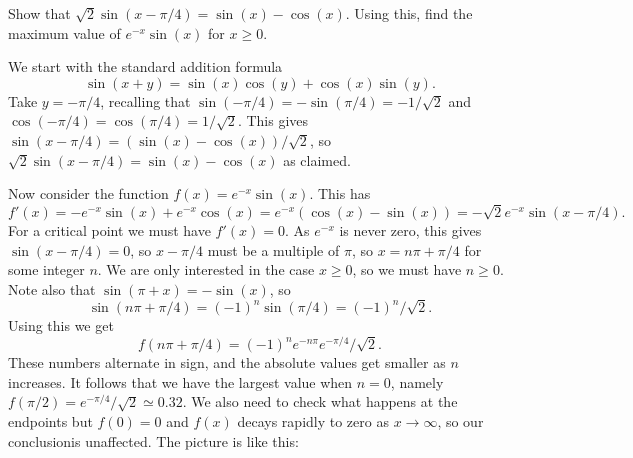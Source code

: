 \documentclass[a4paper]{amsart}
\renewenvironment{solution}{\SolutionInline}{\endSolutionInline}
\begin{document}
\begin{exercise}
 Show that $\sqrt{2}\sin(x-\pi/4)=\sin(x)-\cos(x)$.  Using this, find
 the maximum value of $e^{-x}\sin(x)$ for $x\geq 0$.
\end{exercise}
\begin{solution}
 We start with the standard addition formula
 \[ \sin(x+y) = \sin(x)\cos(y) + \cos(x)\sin(y). \]
 Take $y=-\pi/4$, recalling that
 $\sin(-\pi/4)=-\sin(\pi/4)=-1/\sqrt{2}$ and
 $\cos(-\pi/4)=\cos(\pi/4)=1/\sqrt{2}$.  This gives
 $\sin(x-\pi/4)=(\sin(x)-\cos(x))/\sqrt{2}$, so
 $\sqrt{2}\sin(x-\pi/4)=\sin(x)-\cos(x)$ as claimed.

 Now consider the function $f(x)=e^{-x}\sin(x)$.  This has
 \[ f'(x) = -e^{-x}\sin(x) + e^{-x}\cos(x) = 
     e^{-x}(\cos(x)-\sin(x)) = -\sqrt{2} e^{-x}\sin(x-\pi/4).
 \]
 For a critical point we must have $f'(x)=0$.  As $e^{-x}$ is never
 zero, this gives $\sin(x-\pi/4)=0$, so $x-\pi/4$ must be a multiple
 of $\pi$, so $x=n\pi+\pi/4$ for some integer $n$.  We are only
 interested in the case $x\geq 0$, so we must have $n\geq 0$.  Note
 also that $\sin(\pi+x)=-\sin(x)$, so
 \[ \sin(n\pi+\pi/4)=(-1)^n\sin(\pi/4)=(-1)^n/\sqrt{2}. \]
 Using this we get 
 \[ f(n\pi+\pi/4) = (-1)^n e^{-n\pi}e^{-\pi/4}/\sqrt{2}. \]
 These numbers alternate in sign, and the absolute values get smaller
 as $n$ increases.  It follows that we have the largest value when
 $n=0$, namely $f(\pi/2)=e^{-\pi/4}/\sqrt{2}\simeq 0.32$.  We also
 need to check what happens at the endpoints but $f(0)=0$ and $f(x)$
 decays rapidly to zero as $x\to\infty$, so our conclusionis
 unaffected.  The picture is like this:
 \begin{center}
 \end{center}
\end{solution}
\end{document}
